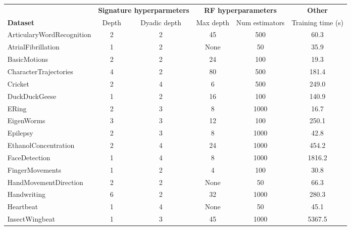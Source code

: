 \begin{tabular}{lccccc}
\toprule
{} & \multicolumn{2}{c}{\textbf{Signature hyperparmeters}} & \multicolumn{2}{c}{\textbf{RF hyperparameters}} & \textbf{Other} \\
\cmidrule(lr){2-3} \cmidrule(lr){4-5} \cmidrule(lr){6-6}
\textbf{Dataset} & Depth &  Dyadic depth & Max depth &  Num estimators &  Training time (s) \\
\midrule
ArticularyWordRecognition &     2 &       2 &            45 &               500 &           60.3 \\
AtrialFibrillation        &     1 &       2 &          None &                50 &           35.9 \\
BasicMotions              &     2 &       2 &            24 &               100 &           19.3 \\
CharacterTrajectories     &     4 &       2 &            80 &               500 &          181.4 \\
Cricket                   &     2 &       4 &             6 &               500 &          249.0 \\
DuckDuckGeese             &     1 &       2 &            16 &               100 &          140.9 \\
ERing                     &     2 &       3 &             8 &              1000 &           16.7 \\
EigenWorms                &     3 &       3 &            12 &               100 &          250.1 \\
Epilepsy                  &     2 &       3 &             8 &              1000 &           42.8 \\
EthanolConcentration      &     2 &       4 &            24 &              1000 &          454.2 \\
FaceDetection             &     1 &       4 &             8 &              1000 &         1816.2 \\
FingerMovements           &     1 &       2 &             4 &               100 &           30.8 \\
HandMovementDirection     &     2 &       2 &          None &                50 &           66.3 \\
Handwriting               &     6 &       2 &            32 &              1000 &          280.3 \\
Heartbeat                 &     1 &       4 &          None &                50 &           45.1 \\
InsectWingbeat            &     1 &       3 &            45 &              1000 &         5367.5 \\

\end{tabular}
